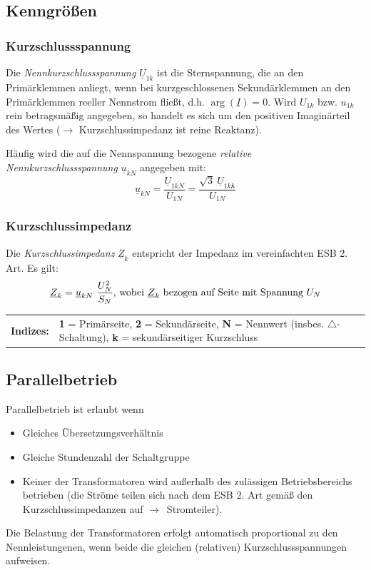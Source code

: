 \documentclass[11pt]{article}
\begin{document}
\subsection*{Kenngrößen}
\subsubsection*{Kurzschlussspannung}
Die \textit{Nennkurzschlussspannung} $\underline U_{1k}$ ist die Sternspannung, die an den Primärklemmen anliegt, wenn bei kurzgeschlossenen Sekundärklemmen an den Primärklemmen reeller Nennstrom fließt, d.h. $\arg(\underline I) = 0$. Wird $U_{1k}$ bzw. $u_{1k}$ rein betragsmäßig angegeben, so handelt es sich um den positiven Imaginärteil des Wertes ($\rightarrow$ Kurzschlussimpedanz ist reine Reaktanz).

\vspace{.5em}
Häufig wird die auf die Nennspannung bezogene \textit{relative Nennkurzschlussspannung} $\underline u_{kN}$ angegeben mit:
\[
	\underline u_{kN} = \frac{\underline U_{1kN}}{U_{1N}} = \frac{\sqrt{3} ~ \underline U_{1k\Yup}}{U_{1N}}
\]

\subsubsection*{Kurzschlussimpedanz}
Die \textit{Kurzschlussimpedanz} $\underline Z_k$ entspricht der Impedanz im vereinfachten ESB 2. Art. Es gilt:
\[
	\underline Z_k = \underline u_{kN} ~ \frac{U_N^2}{S_N} \textnormal{, wobei $\underline Z_k$ bezogen auf Seite mit Spannung $U_N$}
\]

\raggedright
\vspace{12pt}
\footnotesize
\begin{tabular}{r p{13cm}}
	\sffamily\textbf{Indizes:} & \rmfamily \textbf{1} = Primärseite, \textbf{2} = Sekundärseite, \textbf{N} = Nennwert (insbes. $\triangle$-Schaltung), \textbf{k} = sekundärseitiger Kurzschluss
\end{tabular}
\normalsize

\subsection*{Parallelbetrieb}
Parallelbetrieb ist erlaubt wenn
\begin{itemize}
\item Gleiches Übersetzungsverhältnis
\item Gleiche Stundenzahl der Schaltgruppe
\item Keiner der Transformatoren wird außerhalb des zulässigen Betriebsbereichs betrieben (die Ströme teilen sich nach dem ESB 2. Art gemäß den Kurzschlussimpedanzen auf \mbox{$\rightarrow$ Stromteiler}).
\end{itemize}
Die Belastung der Transformatoren erfolgt automatisch proportional zu den Nennleistungenen, wenn beide die gleichen (relativen) Kurzschlussspannungen aufweisen.
\end{document}
